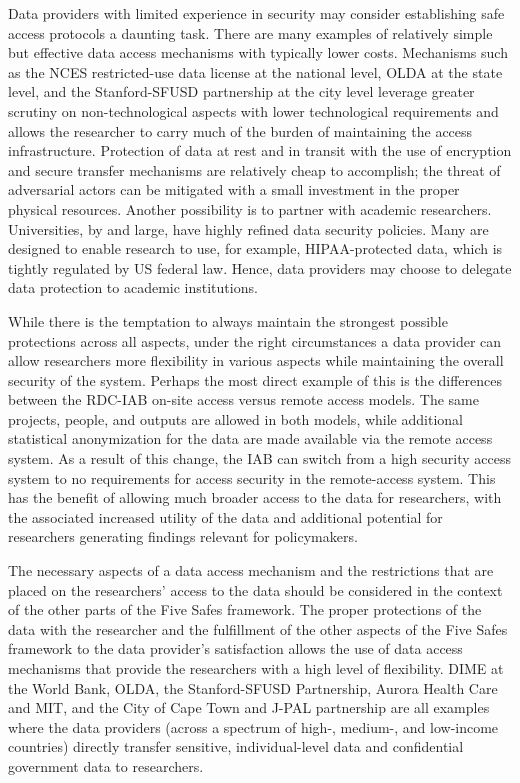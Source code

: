 Data providers with limited experience in security may consider establishing safe access protocols a daunting task. There are many examples of relatively simple but effective data access mechanisms with typically lower costs. Mechanisms such as the NCES restricted-use data license at the national level, OLDA at the state level, and the Stanford-SFUSD partnership at the city level leverage greater scrutiny on non-technological aspects with lower technological requirements and allows the researcher to carry much of the burden of maintaining the access infrastructure. Protection of data at rest and in transit with the use of encryption and secure transfer mechanisms are relatively cheap to accomplish; the threat of adversarial actors can be mitigated with a small investment in the proper physical resources. Another possibility is to partner with academic researchers. Universities, by and large, have highly refined data security policies. Many are designed to enable research to use, for example, HIPAA-protected data, which is tightly regulated by US federal law. Hence, data providers may choose to delegate data protection to academic institutions.

While there is the temptation to always maintain the strongest possible protections across all aspects, under the right circumstances a data provider can allow researchers more flexibility in various aspects while maintaining the overall security of the system. Perhaps the most direct example of this is the differences between the RDC-IAB on-site access versus remote access models. The same projects, people, and outputs are allowed in both models, while additional statistical anonymization for the data are made available via the remote access system. As a result of this change, the IAB can switch from a high security access system to no requirements for access security in the remote-access system. This has the benefit of allowing much broader access to the data for researchers, with the associated increased utility of the data and additional potential for researchers generating findings relevant for policymakers.

The necessary aspects of a data access mechanism and the restrictions that are placed on the researchers' access to the data should be considered in the context of the other parts of the Five Safes framework. The proper protections of the data with the researcher and the fulfillment of the other aspects of the Five Safes framework to the data provider's satisfaction allows the use of data access mechanisms that provide the researchers with a high level of flexibility. DIME at the World Bank, OLDA, the Stanford-SFUSD Partnership, Aurora Health Care and MIT, and the City of Cape Town and J-PAL partnership are all examples where the data providers (across a spectrum of high-, medium-, and low-income countries) directly transfer sensitive, individual-level data and confidential government data to researchers.


